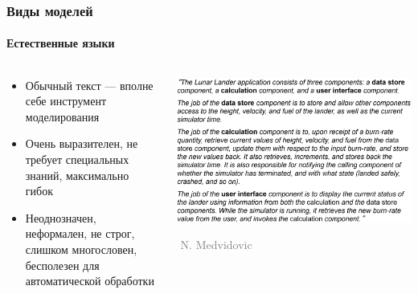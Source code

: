 \documentclass[xetex,mathserif,serif]{beamer}
\newcommand{\attribution}[1] {
    \vspace{-5mm}\begin{flushright}\begin{scriptsize}\textcolor{gray}{\textcopyright\, #1}\end{scriptsize}\end{flushright}
}
\begin{document}
    \begin{frame}
        \frametitle{Виды моделей}
        \framesubtitle{Естественные языки}
        \begin{columns}
            \begin{column}{0.5\textwidth}
                \begin{itemize}
                    \item Обычный текст --- вполне себе инструмент моделирования
                    \item Очень выразителен, не требует специальных знаний, максимально гибок
                    \item Неоднозначен, неформален, не строг, слишком многословен, бесполезен для автоматической обработки
                \end{itemize}
            \end{column}
            \begin{column}{0.5\textwidth}
                \begin{center}
                    \includegraphics[width=\textwidth]{naturalLanguage.png}
                    \attribution{N. Medvidovic}
                \end{center}
            \end{column}
        \end{columns}
    \end{frame}
\end{document}
